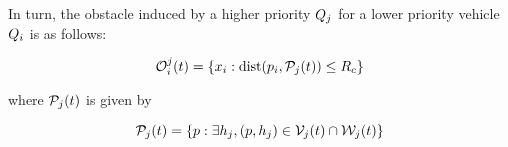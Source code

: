 In turn, the obstacle induced by a higher priority $Q_j$ for a lower priority vehicle $Q_i$ is as follows:

\begin{equation}
\mathcal{O}_i^j(t) = \{x_i: \text{dist}(p_i, \mathcal{P}_j(t)) \le R_c \}
\end{equation}

\noindent where $\mathcal{P}_j(t)$ is given by

\begin{equation}
\mathcal{P}_j(t) = \{p: \exists h_j, (p, h_j) \in \mathcal{V}_j(t) \cap \mathcal{W}_j(t)\}
\end{equation}